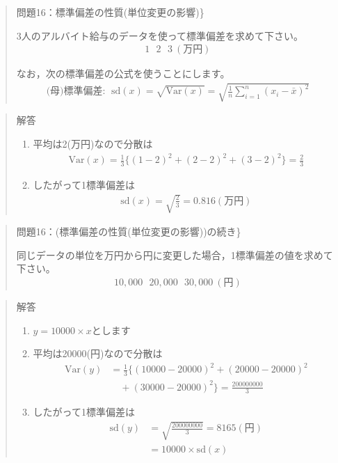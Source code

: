 \documentclass[
]{book}
\theoremstyle{definition}
\theoremstyle{definition}
\theoremstyle{definition}
\theoremstyle{definition}
\theoremstyle{remark}
\begin{document}
\begin{quote}
問題16：標準偏差の性質(単位変更の影響)\}

3人のアルバイト給与のデータを使って標準偏差を求めて下さい。
\begin{align*}
1~~~2~~~3~(\text{万円})
\end{align*}

なお，次の標準偏差の公式を使うことにします。
\begin{align*}
\text{(母)標準偏差}:~~\text{sd}(x)
=\sqrt{\text{Var}(x)}
=\sqrt{\frac{1}{n} \sum_{i=1}^n (x_i-\bar{x})^2} 
\end{align*}
\end{quote}

\begin{quote}
解答

\begin{enumerate}
\def\labelenumi{\arabic{enumi}.}
\item
  平均は2(万円)なので分散は
  \begin{align*}
  \text{Var}(x)=\frac{1}{3} \{ (1-2)^2+(2-2)^2+(3-2)^2 \}=\frac{2}{3}
  \end{align*}
\item
  したがって1標準偏差は
  \begin{align*}
  \text{sd}(x)=\sqrt{\frac{2}{3}}=0.816(\text{万円})
  \end{align*}
\end{enumerate}
\end{quote}

\begin{quote}
問題16：(標準偏差の性質(単位変更の影響))の続き\}

同じデータの単位を万円から円に変更した場合，1標準偏差の値を求めて下さい。
\begin{align*}
10,000~~~20,000~~~30,000~(\text{円})
\end{align*}
\end{quote}

\begin{quote}
解答

\begin{enumerate}
\def\labelenumi{\arabic{enumi}.}
\item
  \(y=10000 \times x\)とします
\item
  平均は20000(円)なので分散は
  \begin{align*}
  \text{Var}(y)&=\frac{1}{3} \{ (10000-20000)^2+(20000-20000)^2 \\
  &\quad +(30000-20000)^2 \}=\frac{200000000}{3}
  \end{align*}
\item
  したがって1標準偏差は
  \begin{align*}
  \text{sd}(y)
  &=\sqrt{\frac{200000000}{3}}=8165(\text{円}) \\
  &=10000 \times \text{sd}(x)
  \end{align*}
\end{enumerate}
\end{quote}
\end{document}
